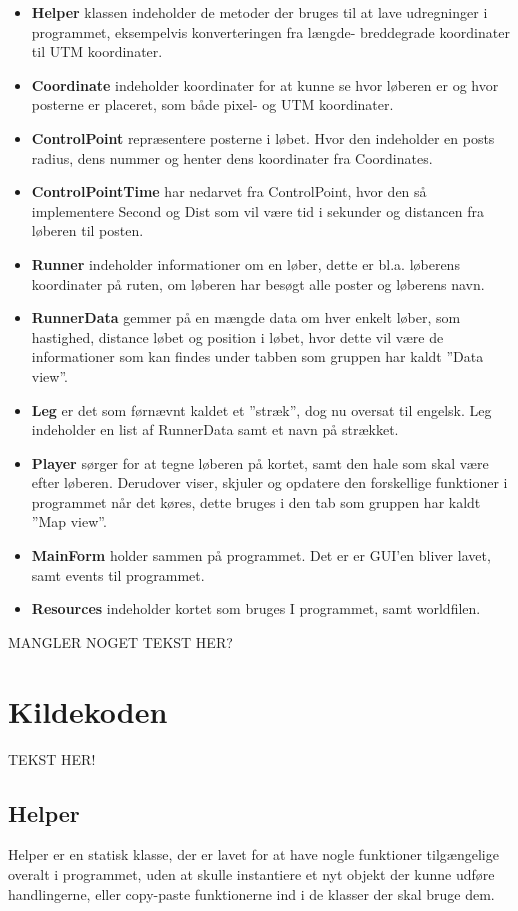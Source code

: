 \begin {itemize}
\item \textbf{Helper} klassen indeholder de metoder der bruges til at lave udregninger i programmet, eksempelvis konverteringen fra længde- breddegrade koordinater til UTM koordinater. 
\item \textbf{Coordinate} indeholder koordinater for at kunne se hvor løberen er og hvor posterne er placeret, som både pixel- og UTM koordinater. 
\item \textbf{ControlPoint} repræsentere posterne i løbet. Hvor den indeholder en posts radius, dens nummer og henter dens koordinater fra Coordinates.
\item \textbf{ControlPointTime} har nedarvet fra ControlPoint, hvor den så implementere Second og Dist som vil være tid i sekunder og distancen fra løberen til posten. 
\item \textbf{Runner} indeholder informationer om en løber, dette er bl.a. løberens koordinater på ruten, om løberen har besøgt alle poster og løberens navn.
\item \textbf{RunnerData} gemmer på en mængde data om hver enkelt løber, som hastighed, distance løbet og position i løbet, hvor dette vil være de informationer som kan findes under tabben som gruppen har kaldt ”Data view”. 
\item \textbf{Leg} er det som førnævnt kaldet et ”stræk”, dog nu oversat til engelsk. Leg indeholder en list af RunnerData samt et navn på strækket.
\item \textbf{Player} sørger for at tegne løberen på kortet, samt den hale som skal være efter løberen. Derudover viser, skjuler og opdatere den forskellige funktioner i programmet når det køres, dette bruges i den tab som gruppen har kaldt ”Map view”.
\item \textbf{MainForm} holder sammen på programmet. Det er er GUI’en bliver lavet, samt events til programmet. 
\item \textbf{Resources} indeholder kortet som bruges I programmet, samt worldfilen.
\end {itemize}

MANGLER NOGET TEKST HER?

\section{Kildekoden}
TEKST HER!

\subsection{Helper}
Helper er en statisk klasse, der er lavet for at have nogle funktioner tilgængelige overalt i programmet, uden at skulle instantiere et nyt objekt der kunne udføre handlingerne, eller copy-paste funktionerne ind i de klasser der skal bruge dem. 

